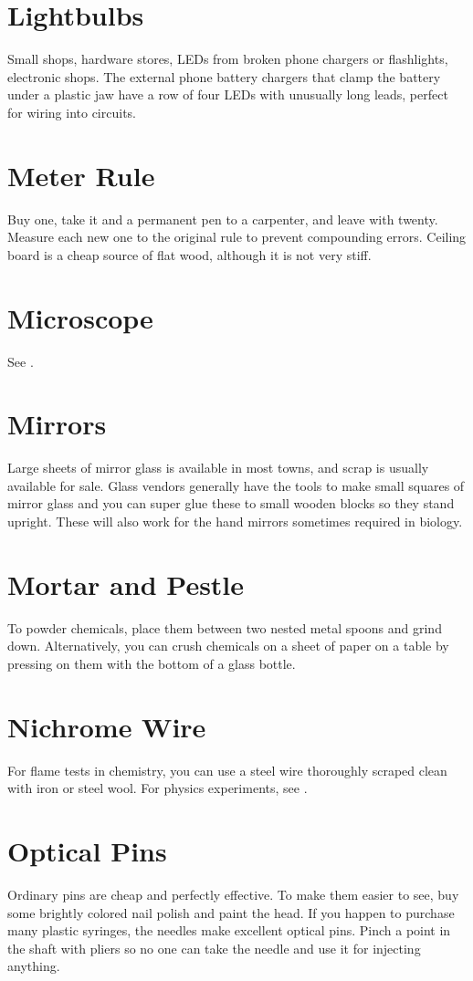 \section{Lightbulbs}
Small shops, 
hardware stores, 
LEDs from broken phone chargers or flashlights, 
electronic shops. 
The external phone battery chargers that clamp the battery 
under a plastic jaw have a row of four LEDs with unusually long leads, 
perfect for wiring into circuits.

\section{Meter Rule}
Buy one, 
take it and a permanent pen to a carpenter, 
and leave with twenty. 
Measure each new one to the original rule to prevent compounding errors. 
Ceiling board is a cheap source of flat wood, 
although it is not very stiff.

\section{Microscope}
See .

\section{Mirrors}
Large sheets of mirror glass is available in most towns, 
and scrap is usually available for sale. 
Glass vendors generally have the tools 
to make small squares of mirror glass 
and you can super glue these to small wooden blocks so they stand upright. 
These will also work for the hand mirrors sometimes required in biology.

\section {Mortar and Pestle}
To powder chemicals, 
place them between two nested metal spoons and grind down. 
Alternatively, 
you can crush chemicals on a sheet of paper on a table 
by pressing on them with the bottom of a glass bottle.

\section{Nichrome Wire}
For flame tests in chemistry, 
you can use a steel wire thoroughly scraped clean with iron or steel wool. 
For physics experiments, 
see .

\section{Optical Pins}
Ordinary pins are cheap and perfectly effective. 
To make them easier to see, 
buy some brightly colored nail polish and paint the head. 
If you happen to purchase many plastic syringes, 
the needles make excellent optical pins. 
Pinch a point in the shaft with pliers so no one can take the needle 
and use it for injecting anything.

